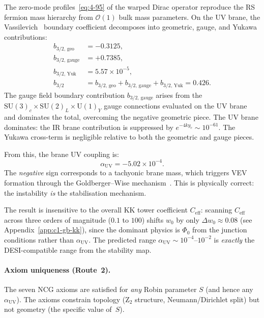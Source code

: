 The zero-mode profiles~\eqref{eq:4-95} of the warped Dirac operator reproduce the RS fermion mass hierarchy from $\mathcal{O}(1)$ bulk mass parameters.  On the UV brane, the Vassilevich~\cite{ch4:Vassilevich2003} boundary coefficient decomposes into geometric, gauge, and Yukawa contributions:
\begin{equation}
\begin{aligned}
  b_{3/2,\,\mathrm{geo}} &= -0.3125, \\
  b_{3/2,\,\mathrm{gauge}} &= +0.7385, \\
  b_{3/2,\,\mathrm{Yuk}} &= 5.57 \times 10^{-5}, \\
  b_{3/2} &= b_{3/2,\,\mathrm{geo}} + b_{3/2,\,\mathrm{gauge}} + b_{3/2,\,\mathrm{Yuk}} = 0.426.
\end{aligned}
  \label{eq:4-b32-components}
\end{equation}
The gauge field boundary contribution $b_{3/2,\,\mathrm{gauge}}$ arises from the $\mathrm{SU}(3)_c \times \mathrm{SU}(2)_L \times \mathrm{U}(1)_Y$ gauge connections evaluated on the UV brane and dominates the total, overcoming the negative geometric piece.  The UV brane dominates: the IR brane contribution is suppressed by $e^{-4ky_c} \sim 10^{-61}$.  The Yukawa cross-term is negligible relative to both the geometric and gauge pieces.

From this, the brane UV coupling is:
\begin{equation}
  \alpha_{\mathrm{UV}} = -5.02 \times 10^{-4}.
  \label{eq:4-alpha-UV-computed}
\end{equation}
The \emph{negative} sign corresponds to a tachyonic brane mass, which triggers VEV formation through the Goldberger--Wise mechanism~\cite{ch4:GoldbergerWise1999}.  This is physically correct: the instability \emph{is} the stabilisation mechanism.

The result is insensitive to the overall KK tower coefficient $C_{\mathrm{eff}}$: scanning $C_{\mathrm{eff}}$ across three orders of magnitude ($0.1$ to $100$) shifts $w_0$ by only $\Delta w_0 \approx 0.08$ (see Appendix~\ref{app:c1-gb-kk}), since the dominant physics is $\Phi_0$ from the junction conditions rather than $\alpha_{\mathrm{UV}}$.  The predicted range $\alpha_{\mathrm{UV}} \sim 10^{-4}\text{--}10^{-2}$ is \emph{exactly} the DESI-compatible range from the stability map.

\paragraph{Axiom uniqueness (Route~2).}
The seven NCG axioms are satisfied for \emph{any} Robin parameter $S$ (and hence any $\alpha_{\mathrm{UV}}$).  The axioms constrain topology (Z$_2$ structure, Neumann/Dirichlet split) but not geometry (the specific value of~$S$).

